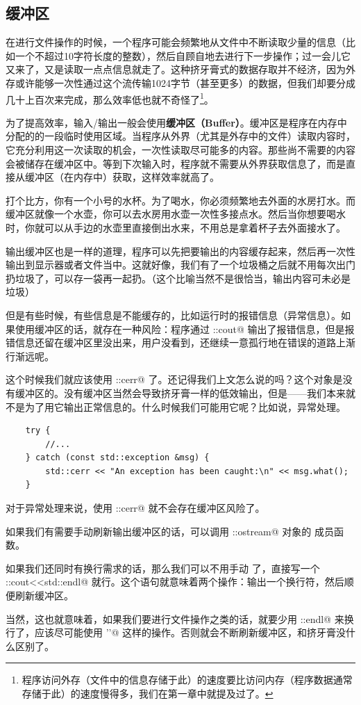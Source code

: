 \subsection*{缓冲区}
在进行文件操作的时候，一个程序可能会频繁地从文件中不断读取少量的信息（比如一个不超过10字符长度的整数），然后自顾自地去进行下一步操作；过一会儿它又来了，又是读取一点点信息就走了。这种挤牙膏式的数据存取并不经济，因为外存或许能够一次性通过这个流传输1024字节（甚至更多）的数据，但我们却要分成几十上百次来完成，那么效率低也就不奇怪了\footnote{程序访问外存（文件中的信息存储于此）的速度要比访问内存（程序数据通常存储于此）的速度慢得多，我们在第一章中就提及过了。}。\par
为了提高效率，输入/输出一般会使用\textbf{缓冲区（Buffer）}。缓冲区是程序在内存中分配的的一段临时使用区域。当程序从外界（尤其是外存中的文件）读取内容时，它充分利用这一次读取的机会，一次性读取尽可能多的内容。那些尚不需要的内容会被储存在缓冲区中。等到下次输入时，程序就不需要从外界获取信息了，而是直接从缓冲区（在内存中）获取，这样效率就高了。\par
打个比方，你有一个小号的水杯。为了喝水，你必须频繁地去外面的水房打水。而缓冲区就像一个水壶，你可以去水房用水壶一次性多接点水。然后当你想要喝水时，你就可以从手边的水壶里直接倒出水来，不用总是拿着杯子去外面接水了。\par
输出缓冲区也是一样的道理，程序可以先把要输出的内容缓存起来，然后再一次性输出到显示器或者文件当中。这就好像，我们有了一个垃圾桶之后就不用每次出门扔垃圾了，可以存一袋再一起扔。（这个比喻当然不是很恰当，输出内容可未必是垃圾）\par
但是有些时候，有些信息是不能缓存的，比如运行时的报错信息（异常信息）。如果使用缓冲区的话，就存在一种风险：程序通过 \lstinline@std::cout@ 输出了报错信息，但是报错信息还留在缓冲区里没出来，用户没看到，还继续一意孤行地在错误的道路上渐行渐远呢。\par
这个时候我们就应该使用 \lstinline@std::cerr@ 了。还记得我们上文怎么说的吗？这个对象是没有缓冲区的。没有缓冲区当然会导致挤牙膏一样的低效输出，但是——我们本来就不是为了用它输出正常信息的。什么时候我们可能用它呢？比如说，异常处理。
\begin{lstlisting}
    try {
        //...
    } catch (const std::exception &msg) {
        std::cerr << "An exception has been caught:\n" << msg.what();
    }
\end{lstlisting}
对于异常处理来说，使用 \lstinline@std::cerr@ 就不会存在缓冲区风险了。\par
如果我们有需要手动刷新输出缓冲区的话，可以调用 \lstinline@std::ostream@ 对象的 \lstinline@flush@ 成员函数。\par
如果我们还同时有换行需求的话，那么我们可以不用手动 \lstinline@flush@ 了，直接写一个 \lstinline@std::cout<<std::endl@ 就行。这个语句就意味着两个操作：输出一个换行符，然后顺便刷新缓冲区。\par
当然，这也就意味着，如果我们要进行文件操作之类的话，就要少用 \lstinline@std::endl@ 来换行了，应该尽可能使用 \lstinline@'\n'@ 这样的操作。否则就会不断刷新缓冲区，和挤牙膏没什么区别了。\par
